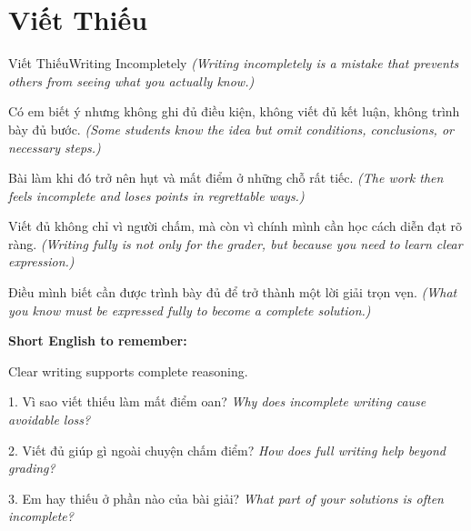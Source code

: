 \section{Viết Thiếu}
\begin{truyen}{Viết Thiếu}{Writing Incompletely}
\textit{(Writing incompletely is a mistake that prevents others from seeing what you actually know.)}

Có em biết ý nhưng không ghi đủ điều kiện, không viết đủ kết luận, không trình bày đủ bước.
\textit{(Some students know the idea but omit conditions, conclusions, or necessary steps.)}

Bài làm khi đó trở nên hụt và mất điểm ở những chỗ rất tiếc.
\textit{(The work then feels incomplete and loses points in regrettable ways.)}

Viết đủ không chỉ vì người chấm, mà còn vì chính mình cần học cách diễn đạt rõ ràng.
\textit{(Writing fully is not only for the grader, but because you need to learn clear expression.)}
\end{truyen}

\begin{baihoc}
Điều mình biết cần được trình bày đủ để trở thành một lời giải trọn vẹn.
\textit{(What you know must be expressed fully to become a complete solution.)}
\end{baihoc}

\begin{ghinhoanh}
\textbf{Short English to remember:}

Clear writing supports complete reasoning.

\end{ghinhoanh}

\begin{tuhocnhanh}
1. Vì sao viết thiếu làm mất điểm oan? \textit{Why does incomplete writing cause avoidable loss?}

2. Viết đủ giúp gì ngoài chuyện chấm điểm? \textit{How does full writing help beyond grading?}

3. Em hay thiếu ở phần nào của bài giải? \textit{What part of your solutions is often incomplete?}
\end{tuhocnhanh}
\ngancach


